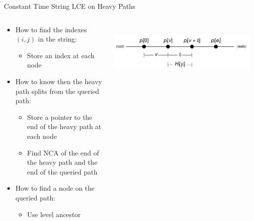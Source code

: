 \documentclass{beamer}
\begin{document}
\begin{frame}{Constant Time String LCE on Heavy Paths}
    \begin{columns}[t]
        \begin{column}{0.7\textwidth}
            \begin{itemize}
                \item How to find the indexes $(i,j)$ in the string:
                \begin{itemize}
                    \item Store an index at each node
                \end{itemize}
                \item How to know then the heavy path splits from the queried path:
                \begin{itemize}
                    \item Store a pointer to the end of the heavy path at each node
                    \item Find NCA of the end of the heavy path and the end of the queried path
                \end{itemize}
                \item How to find a node on the queried path:
                \begin{itemize}
                    \item Use level ancestor
                \end{itemize}
            \end{itemize}
        \end{column}
        \begin{column}{0.3\textwidth}
        \hfill\\
            \includegraphics[width=1\textwidth,page=3]{../doc/tree-fingerprint.pdf}
        \end{column}
    \end{columns}
\end{frame}
\end{document}
